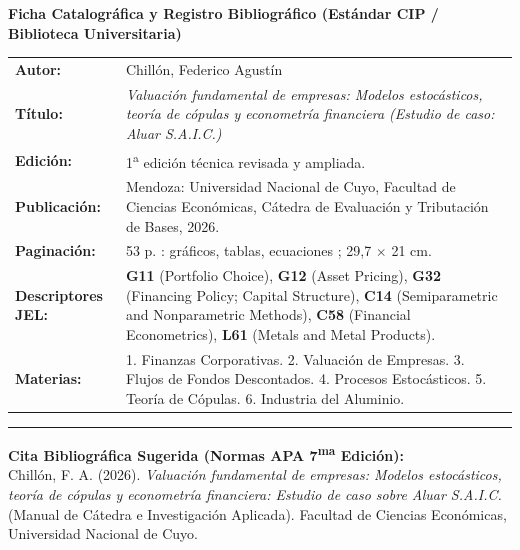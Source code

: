 \documentclass[10pt,a4paper]{article}
\theoremstyle{definition}
\begin{document}
\vspace*{\fill}
\begin{tcolorbox}[colback=white, colframe=primary, boxrule=0.8pt, sharp corners, width=\linewidth, top=4mm, bottom=4mm, left=4mm, right=4mm]
\small
\textbf{Ficha Catalográfica y Registro Bibliográfico (Estándar CIP / Biblioteca Universitaria)}\\[0.3cm]
\begin{tabularx}{\linewidth}{lX}
\textbf{Autor:} & Chillón, Federico Agustín \\
\textbf{Título:} & \textit{Valuación fundamental de empresas: Modelos estocásticos, teoría de cópulas y econometría financiera (Estudio de caso: Aluar S.A.I.C.)} \\
\textbf{Edición:} & 1\textsuperscript{a} edición técnica revisada y ampliada. \\
\textbf{Publicación:} & Mendoza: Universidad Nacional de Cuyo, Facultad de Ciencias Económicas, Cátedra de Evaluación y Tributación de Bases, 2026. \\
\textbf{Paginación:} & 53 p. : gráficos, tablas, ecuaciones ; 29,7 $\times$ 21 cm. \\
\textbf{Descriptores JEL:} & \textbf{G11} (Portfolio Choice), \textbf{G12} (Asset Pricing), \textbf{G32} (Financing Policy; Capital Structure), \textbf{C14} (Semiparametric and Nonparametric Methods), \textbf{C58} (Financial Econometrics), \textbf{L61} (Metals and Metal Products). \\
\textbf{Materias:} & 1. Finanzas Corporativas. 2. Valuación de Empresas. 3. Flujos de Fondos Descontados. 4. Procesos Estocásticos. 5. Teoría de Cópulas. 6. Industria del Aluminio. \\
\end{tabularx}

\vspace{0.3cm}
\hrule
\vspace{0.3cm}

\textbf{Cita Bibliográfica Sugerida (Normas APA 7\textsuperscript{ma} Edición):}\\[0.15cm]
\noindent
Chillón, F. A. (2026). \textit{Valuación fundamental de empresas: Modelos estocásticos, teoría de cópulas y econometría financiera: Estudio de caso sobre Aluar S.A.I.C.} (Manual de Cátedra e Investigación Aplicada). Facultad de Ciencias Económicas, Universidad Nacional de Cuyo.


\end{tcolorbox}
\end{document}
